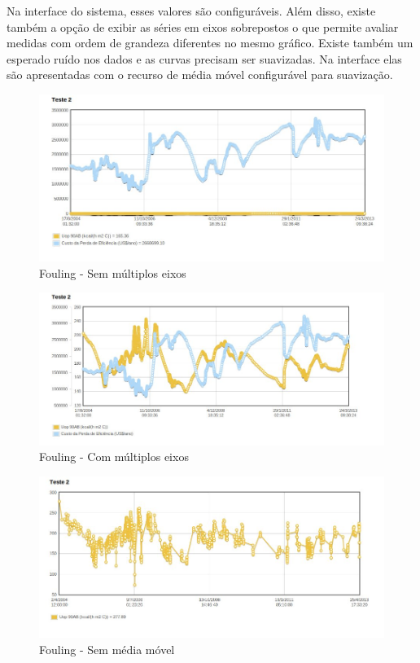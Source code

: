 \documentclass[]{article}
\begin{document}
Na interface do sistema, esses valores são configuráveis. Além disso, existe também a opção de exibir as séries em eixos sobrepostos o que permite avaliar medidas com ordem de grandeza diferentes no mesmo gráfico. Existe também  um esperado ruído nos dados e as curvas precisam ser suavizadas. Na interface elas são apresentadas com o recurso de  média móvel configurável para suavização.

\begin{figure}[!ht]
\centering
\includegraphics[scale=0.5]{./fouling_sem_multieixo}
\caption{Fouling - Sem múltiplos eixos}
\label{fig:fouling_sem_multieixo}
\end{figure}

\begin{figure}[!ht]
\centering
\includegraphics[scale=0.5]{./fouling_com_multieixo}
\caption{Fouling - Com múltiplos eixos}
\label{fig:fouling_com_multieixo}
\end{figure}

\begin{figure}[!ht]
\centering
\includegraphics[scale=.5]{./fouling_sem_suavizar}
\caption{Fouling - Sem média móvel}
\label{fig:fouling_sem_suavizar}
\end{figure}
\end{document}
